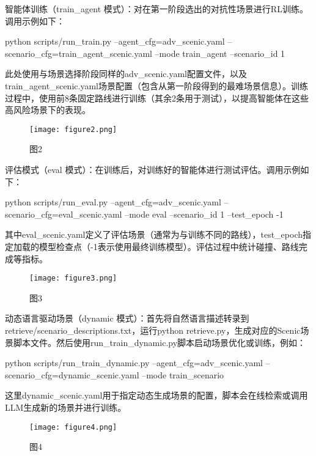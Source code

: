 智能体训练（train\_agent 模式）：对在第一阶段选出的对抗性场景进行RL训练。调用示例如下：

python scripts/run\_train.py --agent\_cfg=adv\_scenic.yaml --scenario\_cfg=train\_agent\_scenic.yaml --mode train\_agent --scenario\_id 1

此处使用与场景选择阶段同样的adv\_scenic.yaml配置文件，以及train\_agent\_scenic.yaml场景配置（包含从第一阶段得到的最难场景信息）。训练过程中，使用前8条固定路线进行训练（其余2条用于测试），以提高智能体在这些高风险场景下的表现。


\begin{figure}[htbp]
	\centering
	\texttt{[image: figure2.png]} %
	\caption{图2} %
	\label{fig:example} %
\end{figure}



评估模式（eval 模式）：在训练后，对训练好的智能体进行测试评估。调用示例如下：

python scripts/run\_eval.py --agent\_cfg=adv\_scenic.yaml --scenario\_cfg=eval\_scenic.yaml --mode eval --scenario\_id 1 --test\_epoch -1

其中eval\_scenic.yaml定义了评估场景（通常为与训练不同的路线），test\_epoch指定加载的模型检查点（-1表示使用最终训练模型）。评估过程中统计碰撞、路线完成等指标。



\begin{figure}[htbp]
	\centering
	\texttt{[image: figure3.png]} %
	\caption{图3} %
	\label{fig:example} %
\end{figure}



动态语言驱动场景（dynamic 模式）：首先将自然语言描述转录到retrieve/scenario\_descriptions.txt，运行python retrieve.py，生成对应的Scenic场景脚本文件。然后使用run\_train\_dynamic.py脚本启动场景优化或训练，例如：

python scripts/run\_train\_dynamic.py --agent\_cfg=adv\_scenic.yaml --scenario\_cfg=dynamic\_scenic.yaml --mode train\_scenario

这里dynamic\_scenic.yaml用于指定动态生成场景的配置，脚本会在线检索或调用LLM生成新的场景并进行训练。


\begin{figure}[htbp]
	\centering
	\texttt{[image: figure4.png]} %
	\caption{图4} %
	\label{fig:example} %
\end{figure}




